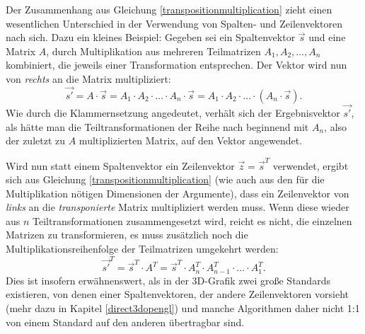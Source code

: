 Der Zusammenhang aus Gleichung \ref{transpositionmultiplication} zieht einen wesentlichen Unterschied in der Verwendung von Spalten- und Zeilenvektoren nach sich. Dazu ein kleines Beispiel: Gegeben sei ein Spaltenvektor $\vec s$ und eine Matrix $A$, durch Multiplikation aus mehreren Teilmatrizen $A_1, A_2, \dots, A_n$ kombiniert, die jeweils einer Transformation entsprechen. Der Vektor wird nun von \emph{rechts} an die Matrix multipliziert:
\begin{equation}
 \vec{s'} = A \cdot \vec{s} = A_1 \cdot A_2 \cdot \ldots \cdot A_n \cdot \vec{s} = A_1 \cdot A_2 \cdot \ldots \cdot \left( A_n \cdot \vec{s} \right).
\end{equation}
Wie durch die Klammernsetzung angedeutet, verhält sich der Ergebnisvektor $\vec{s'}$, als hätte man die Teiltransformationen der Reihe nach beginnend mit $A_n$, also der zuletzt zu $A$ multiplizierten Matrix, auf den Vektor angewendet.

Wird nun statt einem Spaltenvektor ein Zeilenvektor $\vec z = \vec{s}^T$ verwendet, ergibt sich aus Gleichung \ref{transpositionmultiplication} (wie auch aus den für die Multiplikation nötigen Dimensionen der Argumente), dass ein Zeilenvektor von \emph{links} an die \emph{transponierte} Matrix multipliziert werden muss. Wenn diese wieder aus $n$ Teiltransformationen zusammengesetzt wird, reicht es nicht, die einzelnen Matrizen zu transformieren, es muss zusätzlich noch die Multiplikationsreihenfolge der Teilmatrizen umgekehrt werden:
\begin{equation}
 \vec{s'}^T = \vec{s}^T \cdot A^T = \vec{s}^T \cdot A_n^T \cdot A_{n-1}^T \cdot \ldots \cdot A_1^T.
\end{equation}
Dies ist insofern erwähnenswert, als in der 3D-Grafik zwei große Standards existieren, von denen einer Spaltenvektoren, der andere Zeilenvektoren vorsieht (mehr dazu in Kapitel \ref{direct3dopengl}) und manche Algorithmen daher nicht 1:1 von einem Standard auf den anderen übertragbar sind.


